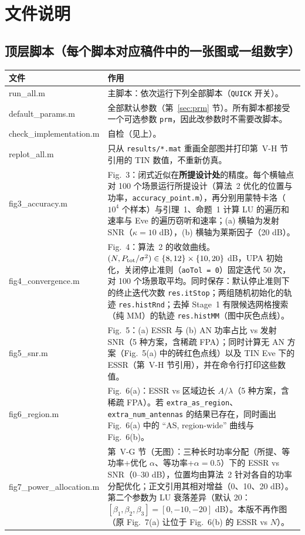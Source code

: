 \documentclass[11pt,a4paper]{ctexart}
\newcommand{\code}[1]{\texttt{#1}}
\newcommand{\Ptot}{P_{\rm tot}}
\begin{document}
\section{文件说明}
\subsection{顶层脚本（每个脚本对应稿件中的一张图或一组数字）}
\begin{longtable}{>{\ttfamily\small}p{4.6cm}p{11.2cm}}
\toprule
文件 & 作用 \\ \midrule
run\_all.m & 主脚本：依次运行下列全部脚本（\code{QUICK} 开关）。\\
default\_params.m & 全部默认参数（第~\ref{sec:prm} 节）。所有脚本都接受一个可选参数 \code{prm}，因此改参数时不需要改脚本。\\
check\_implementation.m & 自检（见上）。\\
replot\_all.m & 只从 \code{results/*.mat} 重画全部图并打印第~V-H 节引用的 TIN 数值，不重新仿真。\\ \midrule
fig3\_accuracy.m & Fig.~3：闭式近似在\textbf{所提设计处}的精度。每个横轴点对 100 个场景运行所提设计（算法~2 优化的位置与功率，\code{accuracy\_point.m}），再分别用蒙特卡洛（$10^4$ 个样本）与引理~1、命题~1 计算 LU 的遍历和速率与 Eve 的遍历窃听和速率；(a) 横轴为发射 SNR（$\kappa=10$ dB），(b) 横轴为莱斯因子（20 dB）。\\
fig4\_convergence.m & Fig.~4：算法~2 的收敛曲线。$(N,\Ptot/\sigma^2)\in\{8,12\}\times\{10,20\}$ dB，UPA 初始化，关闭停止准则（\code{aoTol = 0}）固定迭代 50 次，对 100 个场景取平均。同时保存：默认停止准则下的终止迭代次数 \code{res.itStop}；两组随机初始化的轨迹 \code{res.histRnd}；去掉 Stage~1 有限候选网格搜索（纯 MM）的轨迹 \code{res.histMM}（图中灰色点线）。\\
fig5\_snr.m & Fig.~5：(a) ESSR 与 (b) AN 功率占比 vs 发射 SNR（5 种方案，含稀疏 FPA）；同时计算无 AN 方案（Fig.~5(a) 中的砖红色点线）以及 TIN Eve 下的 ESSR（第~V-H 节引用），并在命令行打印这些数值。\\
fig6\_region.m & Fig.~6(a)：ESSR vs 区域边长 $A/\lambda$（5 种方案，含稀疏 FPA）。若 \code{extra\_as\_region}、\code{extra\_num\_antennas} 的结果已存在，同时画出 Fig.~6(a) 中的 “AS, region-wide” 曲线与 Fig.~6(b)。\\
fig7\_power\_allocation.m & 第~V-G 节（无图）：三种长时功率分配（所提、等功率+优化 $\alpha$、等功率+$\alpha=0.5$）下的 ESSR vs SNR（0--30 dB），位置均由算法~2 针对各自的功率分配优化；正文引用其相对增益（0、10、20 dB）。第二个参数为 LU 衰落差异（默认 20：$[\beta_1,\beta_2,\beta_3]=[0,-10,-20]$ dB）。本版不再作图（原 Fig.~7(a) 让位于 Fig.~6(b) 的 ESSR vs $N$）。\\ \midrule

\end{longtable}
\end{document}
